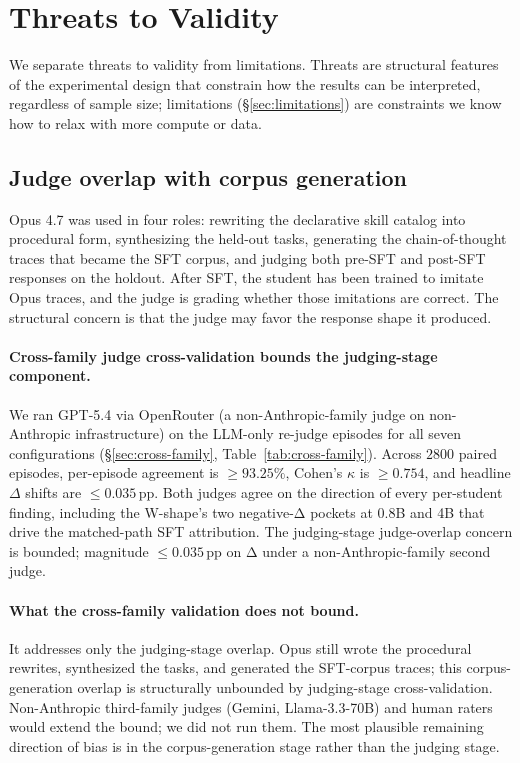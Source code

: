\documentclass[10pt]{article}
\begin{document}
\section{Threats to Validity}\label{sec:threats}

We separate threats to validity from limitations. Threats are structural features of the experimental design that constrain how the results can be interpreted, regardless of sample size; limitations (\S\ref{sec:limitations}) are constraints we know how to relax with more compute or data.

\subsection{Judge overlap with corpus generation}\label{sec:judge-overlap}
Opus 4.7 was used in four roles: rewriting the declarative skill catalog into procedural form, synthesizing the held-out tasks, generating the chain-of-thought traces that became the SFT corpus, and judging both pre-SFT and post-SFT responses on the holdout. After SFT, the student has been trained to imitate Opus traces, and the judge is grading whether those imitations are correct. The structural concern is that the judge may favor the response shape it produced.

\paragraph{Cross-family judge cross-validation bounds the judging-stage component.} We ran GPT-5.4 via OpenRouter (a non-Anthropic-family judge on non-Anthropic infrastructure) on the LLM-only re-judge episodes for all seven configurations (\S\ref{sec:cross-family}, Table~\ref{tab:cross-family}). Across $2800$ paired episodes, per-episode agreement is $\geq 93.25\%$, Cohen's $\kappa$ is $\geq 0.754$, and headline $\Delta$ shifts are $\leq 0.035$\,pp. Both judges agree on the direction of every per-student finding, including the W-shape's two negative-Δ pockets at 0.8B and 4B that drive the matched-path SFT attribution. The judging-stage judge-overlap concern is bounded; magnitude $\leq 0.035$\,pp on Δ under a non-Anthropic-family second judge.

\paragraph{What the cross-family validation does not bound.} It addresses only the judging-stage overlap. Opus still wrote the procedural rewrites, synthesized the tasks, and generated the SFT-corpus traces; this corpus-generation overlap is structurally unbounded by judging-stage cross-validation. Non-Anthropic third-family judges (Gemini, Llama-3.3-70B) and human raters \citep{zheng2023judging} would extend the bound; we did not run them. The most plausible remaining direction of bias is in the corpus-generation stage rather than the judging stage.
\end{document}

